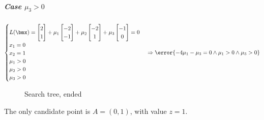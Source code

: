 \documentclass[\main/main.tex]{subfiles}
\begin{document}
\subparagraph*{Case $\mu_3>0$}
\[
  \begin{cases}
    L(\bmx) = \begin{bmatrix}
      2 \\
      1
    \end{bmatrix} + \mu_1 \begin{bmatrix}
      -2 \\
      -1
    \end{bmatrix} + \mu_2 \begin{bmatrix}
      -2 \\
      1
    \end{bmatrix} + \mu_3 \begin{bmatrix}
      -1 \\
      0
    \end{bmatrix} = 0 \\
    x_1                           = 0                                                                                                                 \\
    x_2                           = 1                                                                                                                 \\
    \mu_1 > 0                                                                                                                                         \\
    \mu_2 > 0                                                                                                                                         \\
    \mu_3 > 0
  \end{cases}
  \Rightarrow
  \error{-4\mu_1 - \mu_3 = 0 \land \mu_1 > 0 \land \mu_3 > 0}
\]
\begin{figure}
  \caption{Search tree, ended}
\end{figure}

The only candidate point is $A=(0,1)$, with value $z=1$.
\end{document}
